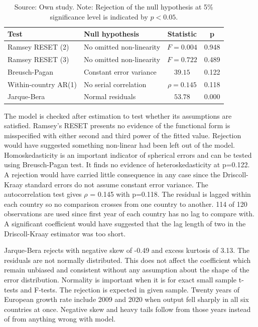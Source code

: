 \begin{table}[H]
    \centering
    \caption{Residual diagnostics}
    \vspace{\baselineskip}
    \begin{tabular}{llcc}
        \toprule
        \textbf{Test} & \textbf{Null hypothesis} & \textbf{Statistic} & \textbf{p} \\
        \midrule
        Ramsey RESET (2)     & No omitted non-linearity     & $F = 0.004$    & 0.948 \\
        Ramsey RESET (3)     & No omitted non-linearity     & $F = 0.722$    & 0.489 \\
        Breusch-Pagan       & Constant error variance      & $39.15$        & 0.122 \\
        Within-country AR(1) & No serial correlation        & $\rho = 0.145$ & 0.118 \\
        Jarque-Bera         & Normal residuals             & $53.78$        & 0.000 \\
        \bottomrule
    \end{tabular}
    \vspace{\baselineskip}
    \caption*{\footnotesize Source: Own study. Note: Rejection of the null hypothesis at 5\% significance level is indicated by $p<0.05$.}
    \label{tab:diagnostics}
\end{table}

The model is checked after estimation to test whether its assumptions are satisfied.
Ramsey's RESET presents no evidence of the functional form is misspecified with either second and third power of the fitted value.
Rejection would have suggested something non-linear had been left out of the model.
Homoskedasticity is an important indicator of spherical errors and can be tested using Breusch-Pagan test.
It finds no evidence of heteroskedasticity at p=0.122.
A rejection would have carried little consequence in any case since the Driscoll-Kraay standard errors do not assume constant error variance.
The autocorrelation test gives $\rho$ = 0.145 with p=0.118.
The residual is lagged within each country so no comparison crosses from one country to another.
114 of 120 observations are used since first year of each country has no lag to compare with.
A significant coefficient would have suggested that the lag length of two in the Driscoll-Kraay estimator was too short.

\vspace{\baselineskip}

Jarque-Bera rejects with negative skew of -0.49 and excess kurtosis of 3.13.
The residuals are not normally distributed.
This does not affect the coefficient which remain unbiased and consistent without any assumption about the shape of the error distribution.
Normality is important when it is for exact small sample t-tests and F-tests.
The rejection is expected in given sample.
Twenty years of European growth rate include 2009 and 2020 when output fell sharply in all six countries at once.
Negative skew and heavy tails follow from those years instead of from anything wrong with model.




